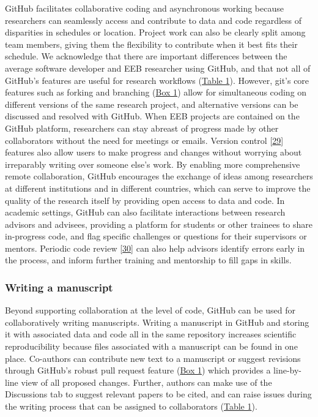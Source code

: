 GitHub facilitates collaborative coding and asynchronous working because researchers can seamlessly access and contribute to data and code regardless of disparities in schedules or location.
Project work can also be clearly split among team members, giving them the flexibility to contribute when it best fits their schedule.
We acknowledge that there are important differences between the average software developer and EEB researcher using GitHub, and that not all of GitHub's features are useful for research workflows (\protect\hyperlink{tbl:roles}{Table 1}).
However, git's core features such as forking and branching (\protect\hyperlink{definitions}{Box 1}) allow for simultaneous coding on different versions of the same research project, and alternative versions can be discussed and resolved with GitHub.
When EEB projects are contained on the GitHub platform, researchers can stay abreast of progress made by other collaborators without the need for meetings or emails.
Version control {[}\protect\hyperlink{ref-K7nbP1Ty}{29}{]} features also allow users to make progress and changes without worrying about irreparably writing over someone else's work.
By enabling more comprehensive remote collaboration, GitHub encourages the exchange of ideas among researchers at different institutions and in different countries, which can serve to improve the quality of the research itself by providing open access to data and code.
In academic settings, GitHub can also facilitate interactions between research advisors and advisees, providing a platform for students or other trainees to share in-progress code, and flag specific challenges or questions for their supervisors or mentors.
Periodic code review {[}\protect\hyperlink{ref-hm9PaCLD}{30}{]} can also help advisors identify errors early in the process, and inform further training and mentorship to fill gaps in skills.

\hypertarget{writing-a-manuscript}{%
\subsubsection{Writing a manuscript}\label{writing-a-manuscript}}

Beyond supporting collaboration at the level of code, GitHub can be used for collaboratively writing manuscripts.
Writing a manuscript in GitHub and storing it with associated data and code all in the same repository increases scientific reproducibility because files associated with a manuscript can be found in one place.
Co-authors can contribute new text to a manuscript or suggest revisions through GitHub's robust pull request feature (\protect\hyperlink{definitions}{Box 1}) which provides a line-by-line view of all proposed changes.
Further, authors can make use of the Discussions tab to suggest relevant papers to be cited, and can raise issues during the writing process that can be assigned to collaborators (\protect\hyperlink{tbl:roles}{Table 1}).

